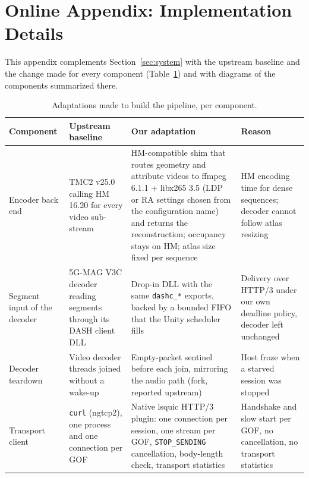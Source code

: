 \section{Online Appendix: Implementation Details}
\label{app:implementation}

This appendix complements Section~\ref{sec:system} with the upstream
baseline and the change made for every component
(Table~\ref{tab:adaptations}) and with diagrams of the components
summarized there.

\begin{table}[!htb]
  \caption{Adaptations made to build the pipeline, per component.}
  \label{tab:adaptations}
  \small
  \setlength{\tabcolsep}{4pt}
  \renewcommand{\arraystretch}{1.12}
  \begin{tabularx}{\textwidth}{@{}>{\raggedright\arraybackslash}p{2.1cm}
                                  >{\raggedright\arraybackslash}p{2.9cm}
                                  >{\raggedright\arraybackslash}X
                                  >{\raggedright\arraybackslash}p{3.2cm}@{}}
    \toprule
    \textbf{Component} & \textbf{Upstream baseline} & \textbf{Our adaptation} & \textbf{Reason} \\
    \midrule
    Encoder back end
      & TMC2 v25.0 calling HM 16.20 for every video sub-stream
      & HM-compatible shim that routes geometry and attribute videos to ffmpeg 6.1.1 + libx265 3.5 (LDP or RA settings chosen from the configuration name) and returns the reconstruction; occupancy stays on HM; atlas size fixed per sequence
      & HM encoding time for dense sequences; decoder cannot follow atlas resizing \\
    Segment input of the decoder
      & 5G-MAG V3C decoder reading segments through its DASH client DLL
      & Drop-in DLL with the same \texttt{dashc\_*} exports, backed by a bounded FIFO that the Unity scheduler fills
      & Delivery over HTTP/3 under our own deadline policy, decoder left unchanged \\
    Decoder teardown
      & Video decoder threads joined without a wake-up
      & Empty-packet sentinel before each join, mirroring the audio path (fork, reported upstream)
      & Host froze when a starved session was stopped \\
    Transport client
      & \texttt{curl} (ngtcp2), one process and one connection per GOF
      & Native lsquic HTTP/3 plugin: one connection per session, one stream per GOF, \texttt{STOP\_SENDING} cancellation, body-length check, transport statistics
      & Handshake and slow start per GOF, no cancellation, no transport statistics \\

\end{tabularx}
\end{table}
